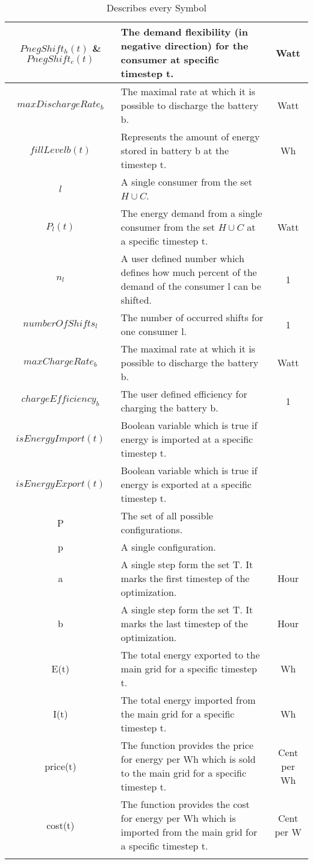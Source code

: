 \begin{longtable}{|c|p{}|c|}
		$PnegShift_{h}(t)$ \& $PnegShift_{c}(t)$ & The demand flexibility (in negative direction) for the consumer at specific timestep t. & Watt \\ \midrule
		$maxDischargeRate_{b}$ & The maximal rate at which it is possible to discharge the battery b. & Watt \\ \midrule
		$fillLevel{b}(t)$ & Represents the amount of energy stored in battery b at the timestep t. & Wh \\ \midrule
		$l$ & A single consumer from the set $H\cup C$. & \\ \midrule
		$P_{l}(t)$ & The energy demand from a single consumer from the set $H\cup C$ at a specific timestep t. & Watt \\ \midrule
		$n_{l}$ & A user defined number which defines how much percent of the demand of the consumer l can be shifted. & 1 \\ \midrule
		$numberOfShifts_{l}$ & The number of occurred shifts for one consumer l. & 1 \\ \midrule
		$maxChargeRate_{b}$ & The maximal rate at which it is possible to discharge the battery b. & Watt \\ \midrule
		$chargeEfficiency_{b}$ & The user defined efficiency for charging the battery b. & 1 \\ \midrule
		$isEnergyImport(t)$ & Boolean variable which is true if energy is imported  at a specific timestep t.&  \\ \midrule
		$isEnergyExport(t)$ & Boolean variable which is true if energy is exported  at a specific timestep t.&  \\ \midrule
		P & The set of all possible configurations. &  \\ \midrule
		p & A single configuration. &  \\ \midrule
		a & A single step form the set T. It marks the first timestep of the optimization. & Hour \\ \midrule
		b & A single step form the set T. It marks the last timestep of the optimization. & Hour \\ \midrule
		E(t) & The total energy exported to the main grid for a specific timestep t. & Wh \\ \midrule
		I(t) & The total energy imported from the main grid for a specific timestep t. & Wh  \\ \midrule
		price(t) & The function provides the price for energy per Wh which is sold to the main grid for a specific timestep t. & Cent per Wh \\ \midrule
		cost(t) & The function provides the cost for energy per Wh which is imported from the main grid for a specific timestep t. & Cent per W \\
		\bottomrule
			\caption[Nomenclature Table]{Describes every Symbol}
		\label{tab:Ergebnisse}
	\end{longtable}


